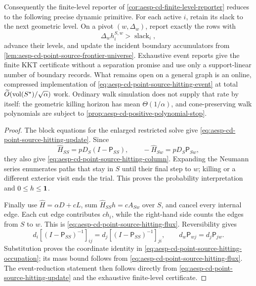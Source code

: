 \begin{proposition}
Consequently the finite-level reporter of
\cref{cor:aesp-cd-finite-level-reporter} reduces to the following precise
dynamic primitive.  For each active \(i\), retain its slack to the next
geometric level.  On a pivot \((w,\Delta_w)\), report exactly the rows with
\begin{equation}
 \Delta_w h^{S,w}_i>\operatorname{slack}_i,
 \label{eq:aesp-cd-point-source-hitting-event}
\end{equation}
advance their levels, and update the incident boundary accumulators from
\cref{lem:aesp-cd-point-source-frontier-universe}.  Exhaustive event reports
give the finite KKT certificate without a separation promise and use only a
support-linear number of boundary records.  What remains open on a general
graph is an online, compressed implementation of
\cref{eq:aesp-cd-point-source-hitting-event} at total
\(\widetilde O(\operatorname{vol}(S^\star)/\sqrt\alpha)\) work.  Ordinary walk simulation
does not supply that rate by itself: the geometric killing horizon has mean
\(\Theta(1/\alpha)\), and cone-preserving walk polynomials are subject to
\cref{prop:aesp-cd-positive-polynomial-stop}.
\end{proposition}

\begin{proof}
The block equations for the enlarged restricted solve give
\cref{eq:aesp-cd-point-source-hitting-update}.  Since
\begin{equation*}
 \widehat H_{SS}=pD_S(I-\mathsf P_{SS}),
 \qquad
 -\widehat H_{Sw}=pD_S\mathsf P_{Sw},
\end{equation*}
they also give \cref{eq:aesp-cd-point-source-hitting-column}.  Expanding the
Neumann series enumerates paths that stay in \(S\) until their final step to
\(w\); killing or a different exterior visit ends the trial.  This proves
the probability interpretation and \(0\leq h\leq\mathbf{1}\).

Finally use \(\widehat H=\alpha D+cL\), sum
\(\widehat H_{SS}h=cA_{Sw}\) over \(S\), and cancel every internal edge.
Each cut edge contributes \(c h_i\), while the right-hand side counts the
edges from \(S\) to \(w\).  This is
\cref{eq:aesp-cd-point-source-hitting-flux}.  Reversibility gives
\begin{equation*}
 d_i[(I-\mathsf P_{SS})^{-1}]_{ij}
 =d_j[(I-\mathsf P_{SS})^{-1}]_{ji},
 \qquad
 d_w\mathsf P_{wj}=d_j\mathsf P_{jw}.
\end{equation*}
Substitution proves the coordinate identity in
\cref{eq:aesp-cd-point-source-hitting-occupation}; its mass bound follows
from \cref{eq:aesp-cd-point-source-hitting-flux}.  The event-reduction
statement then follows directly from
\cref{eq:aesp-cd-point-source-hitting-update} and the exhaustive finite-level
certificate.
\end{proof}

